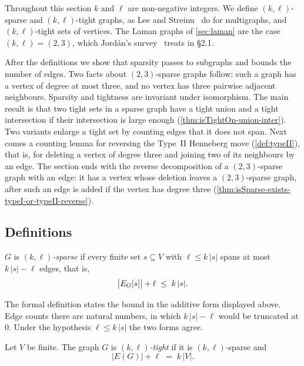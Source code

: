 Throughout this section $k$ and $\ell$ are non-negative integers. We
define $(k,\ell)$-sparse and $(k,\ell)$-tight graphs, as Lee and
Streinu~\cite{leeStreinu2008} do for multigraphs, and $(k,\ell)$-tight
sets of vertices. The Laman graphs of \cref{sec:laman} are the case
$(k,\ell) = (2,3)$, which Jord\'an's survey~\cite{jordan2016} treats in
\S 2.1.

After the definitions we show that sparsity passes to subgraphs and
bounds the number of edges. Two facts about $(2,3)$-sparse graphs
follow: such a graph has a vertex of degree at most three, and no
vertex has three pairwise adjacent neighbours. Sparsity and tightness
are invariant under isomorphism. The main result is that two tight
sets in a sparse graph have a tight union and a tight intersection if
their intersection is large enough (\cref{thm:isTightOn-union-inter}).
Two variants enlarge a tight set by counting edges that it does not
span. Next comes a counting lemma for reversing the Type~II Henneberg
move (\cref{def:typeII}), that is, for deleting a vertex of degree
three and joining two of its neighbours by an edge. The section ends
with the reverse decomposition of a $(2,3)$-sparse graph with an edge:
it has a vertex whose deletion leaves a $(2,3)$-sparse graph, after
such an edge is added if the vertex has degree three
(\cref{thm:isSparse-exists-typeI-or-typeII-reverse}).

\subsection{Definitions}

\begin{definition}
  \label{def:isSparse}
  \leanok
  $G$ is \emph{$(k,\ell)$-sparse} if every finite set $s \subseteq V$
  with $\ell \le k\,|s|$ spans at most $k\,|s| - \ell$ edges, that is,
  \[
    \bigl|E_{G}[s]\bigr| + \ell \;\le\; k\,|s|.
  \]
\end{definition}
\begin{fmlnote}
  The formal definition states the bound in the additive form displayed
  above. Edge counts there are natural numbers, in which
  $k\,|s| - \ell$ would be truncated at $0$. Under the hypothesis
  $\ell \le k\,|s|$ the two forms agree.
\end{fmlnote}

\begin{definition}
  \label{def:isTight}
  \leanok
  Let $V$ be finite. The graph $G$ is \emph{$(k,\ell)$-tight} if it is
  $(k,\ell)$-sparse and
  \[
    |E(G)| + \ell \;=\; k\,|V|.
  \]
\end{definition}

